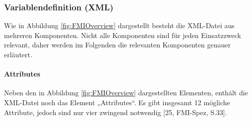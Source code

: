 \subsubsection{Variablendefinition (XML)}\label{sec:Variablendefinition}
Wie in Abbildung \ref{fig:FMIOverview} dargestellt besteht die XML-Datei aus mehreren Komponenten. Nicht alle Komponenten sind für jeden Einsatzzweck relevant, daher werden im Folgenden die relevanten Komponenten genauer erläutert.

\paragraph{Attributes}\label{sec:AttributeFMU}
\noindent Neben den in Abbildung \ref{fig:FMIOverview} dargestellten Elementen, enthält die XML-Datei noch das Element „Attributes“. Es gibt insgesamt 12 mögliche Attribute, jedoch sind nur vier zwingend notwendig [25, FMI-Spez, S.33].
